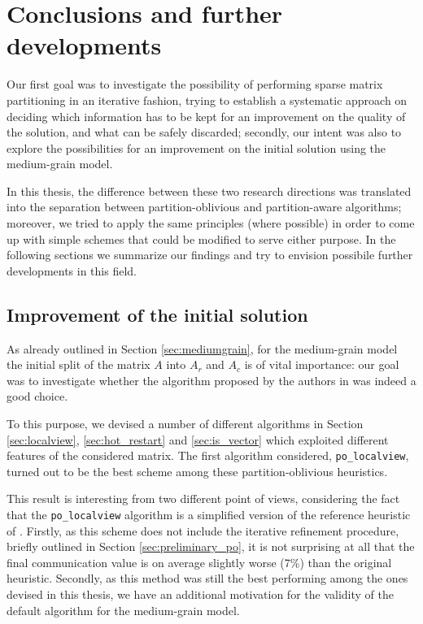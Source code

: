 \chapter{Conclusions and further developments} \label{chap:conclusions}

Our first goal was to investigate the possibility of performing sparse matrix partitioning in an iterative fashion, trying to establish a systematic approach on deciding which information has to be kept for an improvement on the quality of the solution, and what can be safely discarded; secondly, our intent was also to explore the possibilities for an improvement on the initial solution using the medium-grain model.

In this thesis, the difference between these two research directions was translated into the separation between partition-oblivious and partition-aware algorithms; moreover, we tried to apply the same principles (where possible) in order to come up with simple schemes that could be modified to serve either purpose. In the following sections we summarize our findings and try to envision possibile further developments in this field.

\section{Improvement of the initial solution} \label{sec:conclusions_po}

As already outlined in Section \ref{sec:mediumgrain}, for the medium-grain model the initial split of the matrix $A$ into $A_r$ and $A_c$ is of vital importance: our goal was to investigate whether the algorithm proposed by the authors in \cite{mediumgrain} was indeed a good choice.

To this purpose, we devised a number of different algorithms in Section \ref{sec:localview}, \ref{sec:hot_restart} and \ref{sec:is_vector} which exploited different features of the considered matrix. The first algorithm considered, \verb|po_localview|, turned out to be the best scheme among these partition-oblivious heuristics. 

This result is interesting from two different point of views, considering the fact that the \verb|po_localview| algorithm is a simplified version of the reference heuristic of \cite{mediumgrain}. Firstly, as this scheme does not include the iterative refinement procedure, briefly outlined in Section \ref{sec:preliminary_po}, it is not surprising at all that the final communication value is on average slightly worse (7\%) than the original heuristic. Secondly, as this method was still the best performing among the ones devised in this thesis, we have an additional motivation for the validity of the default algorithm for the medium-grain model.

